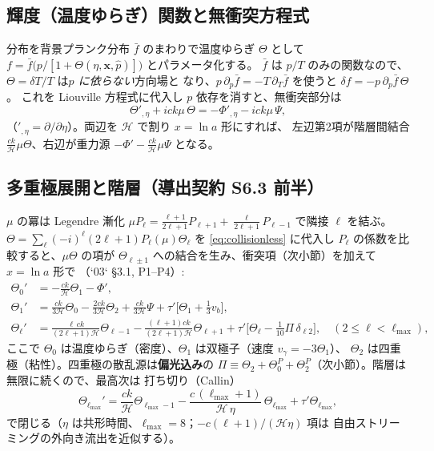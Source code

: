 \subsection{輝度（温度ゆらぎ）関数と無衝突方程式}
分布を背景プランク分布 $\bar f$ のまわりで温度ゆらぎ $\Theta$ として
$f=\bar f\!\big(p/[1+\Theta(\eta,\mathbf x,\hat p)]\big)$ とパラメータ化する。
$\bar f$ は $p/T$ のみの関数なので、$\Theta=\delta T/T$ は\emph{$p$ に依らない}方向場と
なり、$p\,\partial_p\bar f=-T\,\partial_T\bar f$ を使うと $\delta f=-p\,\partial_p\bar f\,\Theta$。
これを Liouville 方程式に代入し $p$ 依存を消すと、無衝突部分は
\begin{equation}
  \Theta'_{,\eta}+ick\mu\,\Theta=-\Phi'_{,\eta}-ick\mu\,\Psi,
  \label{eq:collisionless}
\end{equation}
（$' _{,\eta}=\partial/\partial\eta$）。両辺を $\mathcal H$ で割り $x=\ln a$ 形にすれば、
左辺第2項が階層間結合 $\frac{ck}{\mathcal H}\mu\Theta$、右辺が重力源 $-\Phi'-\frac{ck}{\mathcal H}\mu\Psi$ となる。

\subsection{多重極展開と階層（導出契約 S6.3 前半）}
$\mu$ の冪は Legendre 漸化 $\mu P_\ell=\frac{\ell+1}{2\ell+1}P_{\ell+1}+\frac{\ell}{2\ell+1}P_{\ell-1}$
で隣接 $\ell$ を結ぶ。$\Theta=\sum_\ell(-i)^\ell(2\ell+1)P_\ell(\mu)\Theta_\ell$ を
\eqref{eq:collisionless} に代入し $P_\ell$ の係数を比較すると、$\mu\Theta$ の項が
$\Theta_{\ell\pm1}$ への結合を生み、衝突項（次小節）を加えて $x=\ln a$ 形で
（`03` §3.1, P1--P4）:
\begin{align}
  \Theta_0' &= -\frac{ck}{\mathcal H}\Theta_1-\Phi', \label{eq:P1}\\
  \Theta_1' &= \frac{ck}{3\mathcal H}\Theta_0-\frac{2ck}{3\mathcal H}\Theta_2
  +\frac{ck}{3\mathcal H}\Psi+\tau'\Big[\Theta_1+\tfrac13 v_b\Big], \label{eq:P2}\\
  \Theta_\ell' &= \frac{\ell\,ck}{(2\ell+1)\mathcal H}\Theta_{\ell-1}
  -\frac{(\ell+1)ck}{(2\ell+1)\mathcal H}\Theta_{\ell+1}
  +\tau'\Big[\Theta_\ell-\tfrac{1}{10}\Pi\,\delta_{\ell2}\Big],\quad(2\le\ell<\ell_{\max}), \label{eq:P3}
\end{align}
ここで $\Theta_0$ は温度ゆらぎ（密度）、$\Theta_1$ は双極子（速度 $v_\gamma=-3\Theta_1$）、
$\Theta_2$ は四重極（粘性）。四重極の散乱源は\textbf{偏光込み}の
$\Pi\equiv\Theta_2+\Theta^P_0+\Theta^P_2$（次小節）。階層は無限に続くので、最高次は
打ち切り（Callin）
\begin{equation}
  \Theta_{\ell_{\max}}'=\frac{ck}{\mathcal H}\Theta_{\ell_{\max}-1}
  -\frac{c\,(\ell_{\max}+1)}{\mathcal H\,\eta}\,\Theta_{\ell_{\max}}
  +\tau'\Theta_{\ell_{\max}},
  \label{eq:P4}
\end{equation}
で閉じる（$\eta$ は共形時間、$\ell_{\max}=8$；$-c(\ell+1)/(\mathcal H\eta)$ 項は
自由ストリーミングの外向き流出を近似する）。


